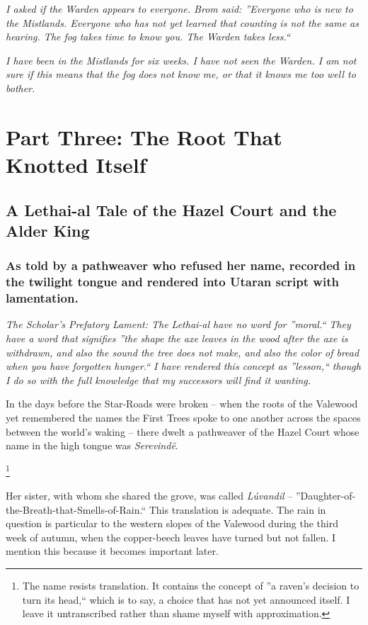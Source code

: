 \documentclass[12pt]{article}
\begin{document}
\textit{I asked if the Warden appears to everyone. Brom said: ''Everyone who is new to the Mistlands. Everyone who has not yet learned that counting is not the same as hearing. The fog takes time to know you. The Warden takes less.``}

\textit{I have been in the Mistlands for six weeks. I have not seen the Warden. I am not sure if this means that the fog does not know me, or that it knows me too well to bother.}

\section{Part Three: The Root That Knotted Itself}
\subsection{A Lethai-al Tale of the Hazel Court and the Alder King}
\subsubsection{As told by a pathweaver who refused her name, recorded in the twilight tongue and rendered into Utaran script with lamentation.}
\textit{The Scholar's Prefatory Lament: The Lethai-al have no word for ''moral.`` They have a word that signifies ''the shape the axe leaves in the wood after the axe is withdrawn, and also the sound the tree does not make, and also the color of bread when you have forgotten hunger.`` I have rendered this concept as ''lesson,`` though I do so with the full knowledge that my successors will find it wanting.}

In the days before the Star-Roads were broken -- when the roots of the Valewood yet remembered the names the First Trees spoke to one another across the spaces between the world's waking -- there dwelt a pathweaver of the Hazel Court whose name in the high tongue was \textit{Serevindë}.

\footnote{The name resists translation. It contains the concept of ''a raven's decision to turn its head,`` which is to say, a choice that has not yet announced itself. I leave it untranscribed rather than shame myself with approximation.}

Her sister, with whom she shared the grove, was called \textit{Lúvandil} -- ''Daughter-of-the-Breath-that-Smells-of-Rain.`` This translation is adequate. The rain in question is particular to the western slopes of the Valewood during the third week of autumn, when the copper-beech leaves have turned but not fallen. I mention this because it becomes important later.
\end{document}
